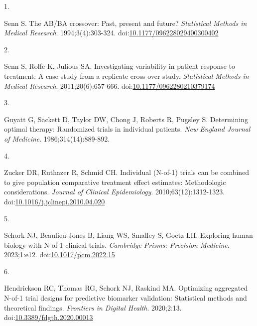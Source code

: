 \documentclass[
  11pt,
]{article}
\newlength{\cslhangindent}
\newlength{\csllabelwidth}
\newenvironment{CSLReferences}[2] %
 {\begin{list}{}{%
  \setlength{\itemindent}{0pt}
  \setlength{\leftmargin}{0pt}
  \setlength{\parsep}{0pt}
  \ifodd #1
   \setlength{\leftmargin}{\cslhangindent}
   \setlength{\itemindent}{-1\cslhangindent}
  \fi
  \setlength{\itemsep}{#2\baselineskip}}}
 {\end{list}}
\newcommand{\CSLLeftMargin}[1]{\parbox[t]{\csllabelwidth}{\strut#1\strut}}
\newcommand{\CSLRightInline}[1]{\parbox[t]{\linewidth - \csllabelwidth}{\strut#1\strut}}
\begin{document}
\protect{}\label{refs}
\begin{CSLReferences}{0}{1}
\CSLLeftMargin{1. }%
\CSLRightInline{Senn S. The {AB/BA} crossover: Past, present and future? \emph{Statistical Methods in Medical Research}. 1994;3(4):303-324. doi:\href{https://doi.org/10.1177/096228029400300402}{10.1177/096228029400300402}}

\CSLLeftMargin{2. }%
\CSLRightInline{Senn S, Rolfe K, Julious SA. Investigating variability in patient response to treatment: A case study from a replicate cross-over study. \emph{Statistical Methods in Medical Research}. 2011;20(6):657-666. doi:\href{https://doi.org/10.1177/0962280210379174}{10.1177/0962280210379174}}

\CSLLeftMargin{3. }%
\CSLRightInline{Guyatt G, Sackett D, Taylor DW, Chong J, Roberts R, Pugsley S. Determining optimal therapy: Randomized trials in individual patients. \emph{New England Journal of Medicine}. 1986;314(14):889-892.}

\CSLLeftMargin{4. }%
\CSLRightInline{Zucker DR, Ruthazer R, Schmid CH. Individual ({N}-of-1) trials can be combined to give population comparative treatment effect estimates: Methodologic considerations. \emph{Journal of Clinical Epidemiology}. 2010;63(12):1312-1323. doi:\href{https://doi.org/10.1016/j.jclinepi.2010.04.020}{10.1016/j.jclinepi.2010.04.020}}

\CSLLeftMargin{5. }%
\CSLRightInline{Schork NJ, Beaulieu-Jones B, Liang WS, Smalley S, Goetz LH. Exploring human biology with {N}-of-1 clinical trials. \emph{Cambridge Prisms: Precision Medicine}. 2023;1:e12. doi:\href{https://doi.org/10.1017/pcm.2022.15}{10.1017/pcm.2022.15}}

\CSLLeftMargin{6. }%
\CSLRightInline{Hendrickson RC, Thomas RG, Schork NJ, Raskind MA. Optimizing aggregated {N}-of-1 trial designs for predictive biomarker validation: Statistical methods and theoretical findings. \emph{Frontiers in Digital Health}. 2020;2:13. doi:\href{https://doi.org/10.3389/fdgth.2020.00013}{10.3389/fdgth.2020.00013}}

\end{CSLReferences}
\end{document}

